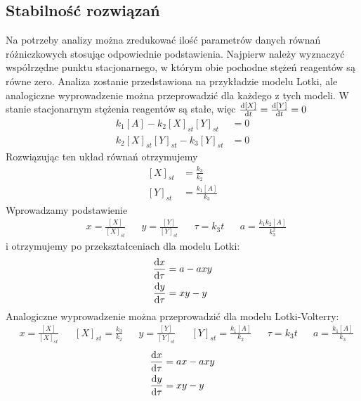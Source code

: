 \documentclass[10pt, a4paper, twoside, onecolumn]{article}
\numberwithin{equation}{section}
\begin{document}
	
	\subsection{Stabilność rozwiązań}
	Na potrzeby analizy można zredukować ilość parametrów danych równań różniczkowych stosując odpowiednie podstawienia. Najpierw należy wyznaczyć współrzędne punktu stacjonarnego, w którym obie pochodne stężeń reagentów są równe zero. Analiza zostanie przedstawiona na przykładzie modelu Lotki, ale analogiczne wyprowadzenie można przeprowadzić dla każdego z tych modeli. W stanie stacjonarnym stężenia reagentów są stałe, więc \(\dv{[X]}{t}=\dv{[Y]}{t}=0\)
	\begin{equation}\label{lotka_pods}
	\begin{split}
		k_{1}[A]-k_{2}[X]_{st}[Y]_{st} &= 0 \\
		k_{2}[X]_{st}[Y]_{st}-k_{3}[Y]_{st} &= 0
	\end{split}
	\end{equation}
	Rozwiązując ten układ równań otrzymujemy
	\begin{equation}\label{lotka_stac}
	\begin{split}
		[X]_{st} &= \frac{k_{3}}{k_{2}} \\
		[Y]_{st} &= \frac{k_{1}[A]}{k_{3}}
	\end{split}
	\end{equation}
	Wprowadzamy podstawienie
	\begin{align*}
		& x=\frac{[X]}{[X]_{st}} && y=\frac{[Y]}{[Y]_{st}} && \tau=k_{3}t && a=\frac{k_{1}k_{2}[A]}{k_{3}^{2}}
	\end{align*}
	i otrzymujemy po przekształceniach dla modelu Lotki:
	\begin{equation}\label{lotka_prosty}
	\begin{split}
		\dv{x}{\tau} &= a-axy \\
		\dv{y}{\tau} &= xy-y
	\end{split}
	\end{equation}
	Analogiczne wyprowadzenie można przeprowadzić dla modelu Lotki-Volterry:
	\begin{align}\label{lotka_volterra_stac}
		& x=\frac{[X]}{[X]_{st}} && [X]_{st} = \frac{k_{3}}{k_{2}} && y=\frac{[Y]}{[Y]_{st}} && [Y]_{st} = \frac{k_{1}[A]}{k_{2}} && \tau=k_{3}t && a=\frac{k_{1}[A]}{k_{3}}
	\end{align}
	\begin{equation}\label{lotka_volterra_prosty}
	\begin{split}
		\dv{x}{\tau} &= ax-axy \\
		\dv{y}{\tau} &= xy-y
	\end{split}
	\end{equation}
\end{document}
